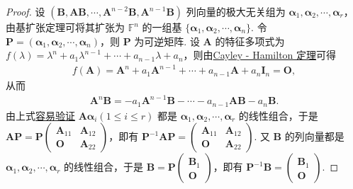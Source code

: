 \documentclass[../../main.tex]{subfiles}%
\begin{document}
\begin{proof}

设 $(\boldsymbol{B},\boldsymbol{A}\boldsymbol{B},\cdots,\boldsymbol{A}^{n - 2}\boldsymbol{B},\boldsymbol{A}^{n - 1}\boldsymbol{B})$ 列向量的极大无关组为 $\boldsymbol{\alpha}_1,\boldsymbol{\alpha}_2,\cdots,\boldsymbol{\alpha}_r$，由基扩张定理可将其扩张为 $\mathbb{F}^n$ 的一组基 $\{\boldsymbol{\alpha}_1,\boldsymbol{\alpha}_2,\cdots,\boldsymbol{\alpha}_n\}$. 令 $\boldsymbol{P}=(\boldsymbol{\alpha}_1,\boldsymbol{\alpha}_2,\cdots,\boldsymbol{\alpha}_n)$，则 $\boldsymbol{P}$ 为可逆矩阵. 设 $\boldsymbol{A}$ 的特征多项式为 $f(\lambda)=\lambda^n + a_1\lambda^{n - 1}+\cdots + a_{n - 1}\lambda + a_n$，则由\hyperref[theorem:Cayley-Hamilton定理]{Cayley - Hamilton 定理}可得
\begin{align*}
f(\boldsymbol{A})=\boldsymbol{A}^n + a_1\boldsymbol{A}^{n - 1}+\cdots + a_{n - 1}\boldsymbol{A}+a_n\boldsymbol{I}_n=\boldsymbol{O},
\end{align*}
从而
\begin{align}\label{equation12312434-1.1}
\boldsymbol{A}^n\boldsymbol{B}=-a_1\boldsymbol{A}^{n - 1}\boldsymbol{B}-\cdots - a_{n - 1}\boldsymbol{A}\boldsymbol{B}-a_n\boldsymbol{B}.    
\end{align}
由上式\hyperlink{例题0.7容易验证的原因}{容易验证} $\boldsymbol{A}\boldsymbol{\alpha}_i(1\leqslant  i\leqslant  r)$ 都是 $\boldsymbol{\alpha}_1,\boldsymbol{\alpha}_2,\cdots,\boldsymbol{\alpha}_r$ 的线性组合，于是 $\boldsymbol{A}\boldsymbol{P}=\boldsymbol{P}\begin{pmatrix}
\boldsymbol{A}_{11} & \boldsymbol{A}_{12} \\
\boldsymbol{O} & \boldsymbol{A}_{22}
\end{pmatrix}$，即有 $\boldsymbol{P}^{-1}\boldsymbol{A}\boldsymbol{P}=\begin{pmatrix}
\boldsymbol{A}_{11} & \boldsymbol{A}_{12} \\
\boldsymbol{O} & \boldsymbol{A}_{22}
\end{pmatrix}$. 又 $\boldsymbol{B}$ 的列向量都是 $\boldsymbol{\alpha}_1,\boldsymbol{\alpha}_2,\cdots,\boldsymbol{\alpha}_r$ 的线性组合，于是 $\boldsymbol{B}=\boldsymbol{P}\begin{pmatrix}
\boldsymbol{B}_1 \\
\boldsymbol{O}
\end{pmatrix}$，即有 $\boldsymbol{P}^{-1}\boldsymbol{B}=\begin{pmatrix}
\boldsymbol{B}_1 \\
\boldsymbol{O}
\end{pmatrix}$.

\end{proof}
\end{document}
